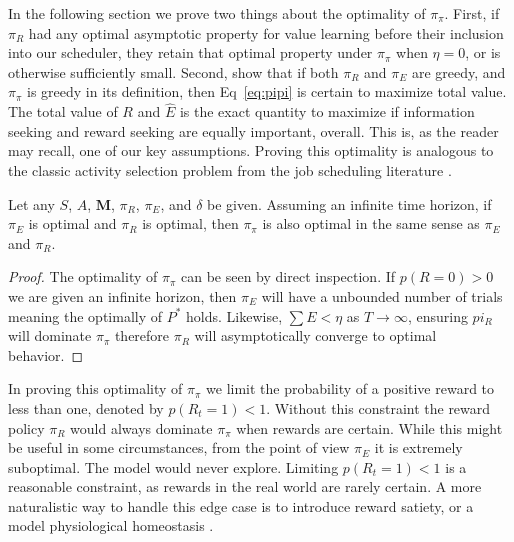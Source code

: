 In the following section we prove two things about the optimality of $\pi_\pi$. First, if $\pi_R$ had any optimal asymptotic property for value learning before their inclusion into our scheduler, they retain that optimal property under $\pi_\pi$ when $\eta = 0$, or is otherwise sufficiently small. Second, show that if both $\pi_R$ and $\pi_E$ are greedy, and $\pi_\pi$ is greedy in its definition, then Eq~\ref{eq:pipi} is certain to maximize total value. The total value of $R$ and $\hat E$ is the exact quantity to maximize if information seeking and reward seeking are equally important, overall. This is, as the reader may recall, one of our key assumptions. Proving this optimality is analogous to the classic activity selection problem from the job scheduling literature \citep{BellmanBook,Roughgarden2019}.

\begin{theorem}[$\pi_{\pi}$ is unbiased] \label{theorem:meta} 
	 Let any $S$, $A$, $\mathbf{M}$, $\pi_R$, $\pi_E$, and $\delta$ be given. Assuming an infinite time horizon, if $\pi_E$ is optimal and $\pi_R$ is optimal, then $\pi_{\pi}$ is also optimal in the same sense as $\pi_E$ and $\pi_R$. 
\end{theorem}
\begin{proof}
	The optimality of $\pi_{\pi}$ can be seen by direct inspection. If $p(R = 0) > 0$ we are given an infinite horizon, then $\pi_E$ will have a unbounded number of trials meaning the optimally of $P^*$ holds. Likewise, $\sum E < \eta$ as $T \rightarrow \infty$, ensuring $pi_R$ will dominate $\pi_{\pi}$ therefore $\pi_R$ will asymptotically converge to optimal behavior. 
\end{proof}

In proving this optimality of $\pi_{\pi}$ we limit the probability of a positive reward to less than one, denoted by $p(R_t = 1) < 1$. Without this constraint the reward policy $\pi_R$ would always dominate $\pi_{\pi}$ when rewards are certain. While this might be useful in some circumstances, from the point of view $\pi_E$ it is extremely suboptimal. The model would never explore. Limiting $p(R_t = 1) < 1$ is a reasonable constraint, as rewards in the real world are rarely certain. A more naturalistic way to handle this edge case is to introduce reward satiety, or a model physiological homeostasis \citep{Keramati2014,Juechems2019}.

